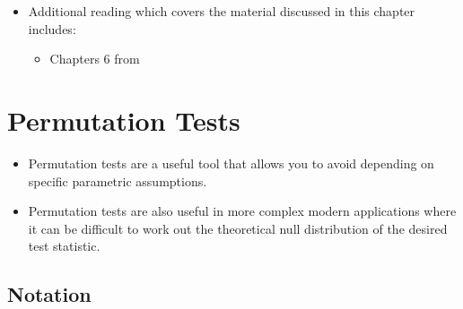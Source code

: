 \documentclass[]{book}
\providecommand{\tightlist}{%
  \setlength{\itemsep}{0pt}\setlength{\parskip}{0pt}}
\begin{document}
\begin{itemize}
\tightlist
\item
  Additional reading which covers the material discussed in this chapter includes:

  \begin{itemize}
  \tightlist
  \item
    Chapters 6 from \citet{hollander2013}
  \end{itemize}
\end{itemize}

\hypertarget{permutation}{%
\chapter{Permutation Tests}\label{permutation}}

\begin{itemize}
\item
  Permutation tests are a useful tool that allows you to avoid depending on
  specific parametric assumptions.
\item
  Permutation tests are also useful in more complex modern applications where it can be
  difficult to work out the theoretical null distribution of the desired test statistic.
\end{itemize}

\hypertarget{notation}{%
\section{Notation}\label{notation}}
\end{document}
